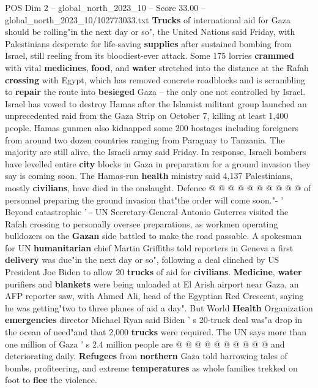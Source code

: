 \begin{textsample}{POS Dim 2 – global\_north\_2023\_10 – Score 33.00 – global\_north\_2023\_10/102773033.txt}  \label{ex:f2_pos_284}
\textbf{Trucks} of international aid for Gaza should be rolling"in the next day or so", the United Nations said Friday, with Palestinians desperate for life-saving \textbf{supplies} after sustained bombing from Israel, still reeling from its bloodiest-ever attack.
Some 175 lorries \textbf{crammed} with vital \textbf{medicines}, \textbf{food}, and \textbf{water} stretched into the distance at the Rafah \textbf{crossing} with Egypt, which has removed concrete roadblocks and is scrambling to \textbf{repair} the route into \textbf{besieged} Gaza -- the only one not controlled by Israel.
Israel has vowed to destroy Hamas after the Islamist militant group launched an unprecedented raid from the Gaza Strip on October 7, killing at least 1,400 people.
Hamas gunmen also kidnapped some 200 hostages including foreigners from around two dozen countries ranging from Paraguay to Tanzania.
The majority are still alive, the Israeli army said Friday.
In response, Israeli bombers have levelled entire \textbf{city} blocks in Gaza in preparation for a ground invasion they say is coming soon.
The Hamas-run \textbf{health} ministry said 4,137 Palestinians, mostly \textbf{civilians}, have died in the onslaught.
Defence @ @ @ @ @ @ @ @ @ @ of personnel preparing the ground invasion that"the order will come soon."- ' Beyond catastrophic ' - UN Secretary-General Antonio Guterres visited the Rafah crossing to personally oversee preparations, as workmen operating bulldozers on the \textbf{Gazan} side battled to make the road passable.
A spokesman for UN \textbf{humanitarian} chief Martin Griffiths told reporters in Geneva a first \textbf{delivery} was due"in the next day or so", following a deal clinched by US President Joe Biden to allow 20 \textbf{trucks} of aid for \textbf{civilians}. \textbf{Medicine}, \textbf{water} purifiers and \textbf{blankets} were being unloaded at El Arish airport near Gaza, an AFP reporter saw, with Ahmed Ali, head of the Egyptian Red Crescent, saying he was getting"two to three planes of aid a day".
But World \textbf{Health} Organization \textbf{emergencies} director Michael Ryan said Biden ' s 20-truck deal was"a drop in the ocean of need"and that 2,000 \textbf{trucks} were required.
The UN says more than one million of Gaza ' s 2.4 million people are @ @ @ @ @ @ @ @ @ @ and deteriorating daily. \textbf{Refugees} from \textbf{northern} Gaza told harrowing tales of bombs, profiteering, and extreme \textbf{temperatures} as whole families trekked on foot to \textbf{flee} the violence.

\end{textsample}
